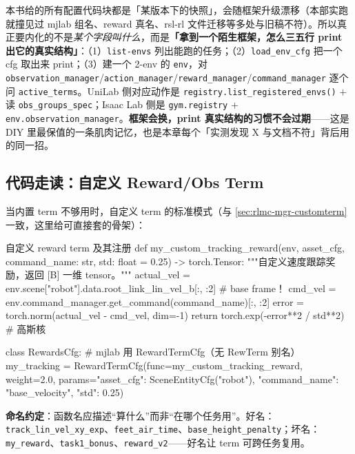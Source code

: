 \begin{insight}\label{ins:rlmc-diy-introspect}
本书给的所有配置代码块都是「某版本下的快照」，会随框架升级漂移（本部实跑就撞见过 mjlab 组名、reward 真名、rsl-rl 文件迁移等多处与旧稿不符）。所以真正要内化的不是\emph{某个字段叫什么}，而是\textbf{「拿到一个陌生框架，怎么三五行 print 出它的真实结构」}：（1）\verb|list-envs| 列出能跑的任务；（2）\verb|load_env_cfg| 把一个 cfg 取出来 print；（3）建一个 2-env 的 \verb|env|，对 \verb|observation_manager|/\verb|action_manager|/\verb|reward_manager|/\verb|command_manager| 逐个问 \verb|active_terms|。UniLab 侧对应动作是 \verb|registry.list_registered_envs()| $+$ 读 \verb|obs_groups_spec|；Isaac Lab 侧是 \verb|gym.registry| $+$ \verb|env.observation_manager|。\textbf{框架会换，print 真实结构的习惯不会过期}——这是 DIY 里最保值的一条肌肉记忆，也是本章每个「实测发现 X 与文档不符」背后用的同一招。
\end{insight}

\subsection{代码走读：自定义 Reward/Obs Term}
\label{sec:rlmc-diy-customterm}

当内置 term 不够用时，自定义 term 的标准模式（与 \cref{sec:rlmc-mgr-customterm} 一致，这里给可直接套的骨架）：

\begin{codebox}[Python]{自定义 reward term 及其注册}
def my_custom_tracking_reward(env, asset_cfg, command_name: str,
                              std: float = 0.25) -> torch.Tensor:
    """自定义速度跟踪奖励，返回 [B] 一维 tensor。"""
    actual_vel = env.scene["robot"].data.root_link_lin_vel_b[:, :2]  # base frame！
    cmd_vel    = env.command_manager.get_command(command_name)[:, :2]
    error      = torch.norm(actual_vel - cmd_vel, dim=-1)
    return torch.exp(-error**2 / std**2)                            # 高斯核

class RewardsCfg:                          # mjlab 用 RewardTermCfg（无 RewTerm 别名）
    my_tracking = RewardTermCfg(func=my_custom_tracking_reward, weight=2.0,
        params={"asset_cfg": SceneEntityCfg("robot"),
                "command_name": "base_velocity", "std": 0.25})
\end{codebox}

\textbf{命名约定}：函数名应描述“算什么”而非“在哪个任务用”。好名：\verb|track_lin_vel_xy_exp|、\verb|feet_air_time|、\verb|base_height_penalty|；坏名：\verb|my_reward|、\verb|task1_bonus|、\verb|reward_v2|——好名让 term 可跨任务复用。

